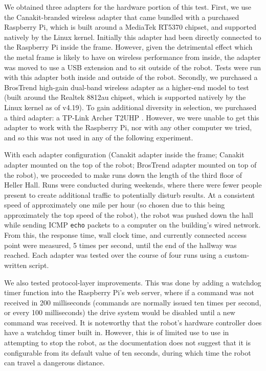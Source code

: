\documentclass{IEEEtran}
\begin{document}
We obtained three adapters for the hardware portion of this test. First, we
use the Canakit-branded wireless adapter that came bundled with a purchased
Raspberry Pi\cite{canakit}, which is built around a MediaTek RT5370 chipset,
and supported natively by the Linux kernel. Initially this adapter had been
directly connected to the Raspberry Pi inside the frame. However, given the
detrimental effect which the metal frame is likely to have on wireless 
performance from inside, the adapter was moved to use a USB extension and to
sit outside of the robot. Tests were run with this adapter both inside and
outside of the robot. Secondly, we purchased a BrosTrend high-gain dual-band
wireless adapter as a higher-end model to test\cite{brostrend} (built around
the Realtek 8812au chipset, which is supported natively by the Linux kernel
as of v4.19). To gain additional diversity in selection, we
purchased a third adapter: a TP-Link Archer T2UHP \cite{archer}. However,
we were unable to get this adapter to work with the Raspberry Pi, nor with
any other computer we tried, and so this was not used in any of the following
experiment.

With each adapter configuration (Canakit adapter inside the frame; Canakit
adapter mounted on the top of the robot; BrosTrend adapter mounted on top
of the robot), we proceeded to make runs down the length of the third
floor of Heller Hall. Runs were conducted during weekends, where there were
fewer people present to create additional traffic to potentially disturb
results. At a consistent speed of approximately one mile per hour (so chosen
due to this being approximately the top speed of the robot), the robot was
pushed down the hall while sending ICMP \texttt{echo} packets to a computer
on the building's wired network. From this, the response time, wall clock
time, and currently connected access point were measured, 5 times per second,
until the end of the hallway was reached. Each adapter was tested over the
course of four runs using a custom-written script\cite{hallway-script}.

We also tested protocol-layer improvements. This was done by adding a
watchdog timer function\cite{watchdog} into the Raspberry Pi's web server,
where if a command was not received in 200 milliseconds (commands are
normally issued ten times per second, or every 100 milliseconds) the drive
system would be disabled until a new command was received. It is noteworthy
that the robot's hardware controller does have a watchdog timer built in. 
However, this is of limited use to use in attempting to stop the robot, as
the documentation does not suggest that it is configurable from its default
value of ten seconds, during which time the robot can travel a dangerous
distance.
\end{document}
